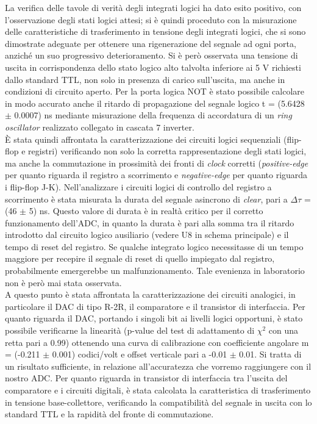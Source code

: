 \documentclass[journal]{IEEEtran}
\begin{document}
La verifica delle tavole di verità degli integrati logici ha dato esito positivo, con l'osservazione degli stati logici attesi; si è quindi proceduto con la misurazione delle caratteristiche di trasferimento in tensione degli integrati logici, che si sono dimostrate adeguate per ottenere una rigenerazione del segnale ad ogni porta, anziché un suo progressivo deterioramento. Si è però osservata una tensione di uscita in corrispondenza dello stato logico alto talvolta inferiore ai 5 V richiesti dallo standard TTL, non solo in presenza di carico sull'uscita, ma anche in condizioni di circuito aperto. Per la porta logica NOT è stato possibile calcolare in modo accurato anche il ritardo di propagazione del segnale logico t = (5.6428 $\pm$ 0.0007) ns mediante misurazione della frequenza di accordatura di un \textit{ring oscillator} realizzato collegato in cascata 7 inverter.
\\

È stata quindi affrontata la caratterizzazione dei circuiti logici sequenziali (flip-flop e registri) verificando non solo la corretta rappresentazione degli stati logici, ma anche la commutazione in prossimità dei fronti di \textit{clock} corretti (\textit{positive-edge} per quanto riguarda il registro a scorrimento e \textit{negative-edge} per quanto riguarda i flip-flop J-K). Nell'analizzare i circuiti logici di controllo del registro a scorrimento è stata misurata la durata del segnale asincrono di \textit{clear}, pari a $\Delta\tau$ = (46 $\pm$ 5) ns. Questo valore di durata è in realtà critico per il corretto funzionamento dell'ADC, in quanto la durata è pari alla somma tra il ritardo introdotto dal circuito logico ausiliario (vedere U8 in schema principale) e il tempo di reset del registro. Se qualche integrato logico necessitasse di un tempo maggiore per recepire il segnale di reset di quello impiegato dal registro, probabilmente emergerebbe un malfunzionamento. Tale evenienza in laboratorio non è però mai stata osservata.
\\

A questo punto è stata affrontata la caratterizzazione dei circuiti analogici, in particolare il DAC di tipo R-2R, il comparatore e il transistor di interfaccia. Per quanto riguarda il DAC, portando i singoli bit ai livelli logici opportuni, è stato possibile verificarne la linearità (p-value del test di adattamento di $\chi^2$ con una retta pari a 0.99) ottenendo una curva di calibrazione con coefficiente angolare m = (-0.211 $\pm$ 0.001) codici/volt e offset verticale pari a -0.01 $\pm$ 0.01. Si tratta di un risultato sufficiente, in relazione all'accuratezza che vorremo raggiungere con il nostro ADC. Per quanto riguarda in transistor di interfaccia tra l'uscita del comparatore e i circuiti digitali, è stata calcolata la caratteristica di trasferimento in tensione base-collettore, verificando la compatibilità del segnale in uscita con lo standard TTL e la rapidità del fronte di commutazione. 
\\
\end{document}
